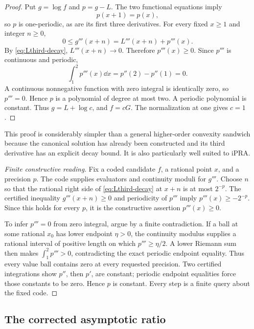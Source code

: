 \begin{proof}
Put \(g=\log f\) and \(p=g-L\).  The two functional equations imply
\[
 p(x+1)=p(x),
\]
so \(p\) is one-periodic, as are its first three derivatives.  For every fixed
\(x\ge1\) and integer \(n\ge0\),
\[
 0\le g'''(x+n)=L'''(x+n)+p'''(x).
\]
By \cref{eq:Lthird-decay}, \(L'''(x+n)\to0\).  Therefore
\(p'''(x)\ge0\).  Since \(p'''\) is continuous and periodic,
\[
 \int_1^2p'''(x)\dd x=p''(2)-p''(1)=0.
\]
A continuous nonnegative function with zero integral is identically zero, so
\(p'''=0\).  Hence \(p\) is a polynomial of degree at most two.  A periodic
polynomial is constant.  Thus \(g=L+\log c\), and
\(f=cG\).  The normalization at one gives \(c=1\).
\end{proof}

This proof is considerably simpler than a general higher-order convexity
sandwich because the canonical solution has already been constructed and its
third derivative has an explicit decay bound.  It is also particularly well
suited to iPRA.

\begin{proof}[Finite constructive reading]
Fix a coded candidate \(f\), a rational point \(x\), and a precision \(p\).
The code supplies evaluators and continuity moduli for \(g'''\).  Choose
\(n\) so that the rational right side of \cref{eq:Lthird-decay} at \(x+n\) is
at most \(2^{-p}\).  The certified inequality \(g'''(x+n)\ge0\) and periodicity
of \(p'''\) imply
\(p'''(x)\ge-2^{-p}\).  Since this holds for every \(p\), it is the
constructive assertion \(p'''(x)\ge0\).

To infer \(p'''=0\) from zero integral, argue by a finite contradiction.  If a
ball at some rational \(x_0\) has lower endpoint \(\eta>0\), the continuity
modulus supplies a rational interval of positive length on which
\(p'''\ge\eta/2\).  A lower Riemann sum then makes
\(\int_1^2p'''>0\), contradicting the exact periodic endpoint equality.  Thus
every value ball contains zero at every requested precision.  Two certified
integrations show \(p''\), then \(p'\), are constant; periodic endpoint
equalities force those constants to be zero.  Hence \(p\) is constant.
Every step is a finite query about the fixed code.
\end{proof}

\subsection{The corrected asymptotic ratio}

